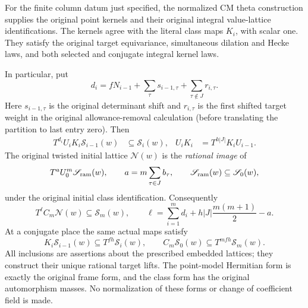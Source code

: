 \begin{theorem}
\label{thm:actual-theta-chain}
For the finite column datum just specified, the normalized CM theta
construction supplies the original point kernels and their original
integral value-lattice identifications.  The kernels agree with the
literal class maps $K_i$, with scalar one.  They satisfy the original
target equivariance, simultaneous dilation and Hecke laws, and both
selected and conjugate integral kernel laws.

In particular, put
\[
 d_i=fN_{i-1}+\sum_\tau s_{i-1,\tau}
               +\sum_{\tau\notin J}r_{i,\tau}.
\]
Here $s_{i-1,\tau}$ is the original determinant shift and
$r_{i,\tau}$ is the first shifted target weight in the original
allowance-removal calculation (before translating the partition to
last entry zero).  Then
\begin{align}
 T^{d_i}U_iK_i\mathscr S_{i-1}(w)&\subseteq\mathscr S_i(w),
       &U_iK_i&=T^{h|J|}K_iU_{i-1}.
       \label{eq:actual-chain-step}
\end{align}
The original twisted initial lattice $\mathscr N(w)$ is the
\emph{rational image} of
\[
 T^aU_0^m\mathscr S_{\rm ram}(w),\qquad
 a=m\sum_{\tau\in J}b_\tau,\qquad
 \mathscr S_{\rm ram}(w)\subseteq\mathscr S_0(w),
\]
under the original initial class identification.  Consequently
\[
 T^\ell C_m\mathscr N(w)\subseteq\mathscr S_m(w),\qquad
 \ell=\sum_{i=1}^m d_i+h|J|\frac{m(m+1)}2-a.
 \label{eq:actual-chain-selected}
\]
At a conjugate place the same actual maps satisfy
\[
 K_i\mathscr S_{i-1}(w)\subseteq T^{fh}\mathscr S_i(w),
 \qquad C_m\mathscr S_0(w)\subseteq T^{mfh}\mathscr S_m(w).
 \label{eq:actual-chain-conjugate}
\]
All inclusions are assertions about the prescribed embedded lattices;
they construct their unique rational target lifts.  The point-model
Hermitian form is exactly the original frame form, and the class form
has the original automorphism masses.  No normalization of these forms
or change of coefficient field is made.
\end{theorem}

